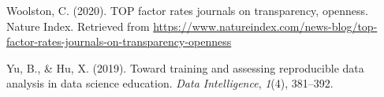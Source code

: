 \documentclass[12pt,twoside]{reedthesis}
\begin{document}
\leavevmode\hypertarget{ref-top-guidelines}{}%
Woolston, C. (2020). TOP factor rates journals on transparency, openness. Nature Index. Retrieved from \url{https://www.natureindex.com/news-blog/top-factor-rates-journals-on-transparency-openness}

\leavevmode\hypertarget{ref-yu2019toward}{}%
Yu, B., \& Hu, X. (2019). Toward training and assessing reproducible data analysis in data science education. \emph{Data Intelligence}, \emph{1}(4), 381--392.


\end{document}
